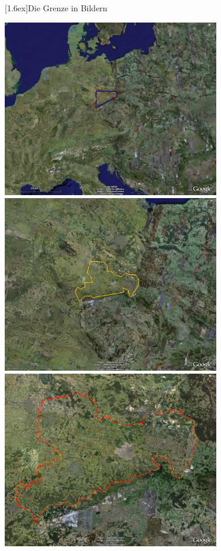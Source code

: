 \documentclass[final]{beamer}
\newlength{\columnheight}
\newlength{\marginw}
\newlength{\tw}
\newlength{\colw}
\newenvironment{myTwoColPoster}{%
  \begin{minipage}[t]{\textwidth}%
    \hspace*{\marginw}%
    \hspace*{9.5bp}%
    \begin{minipage}[t]{\tw}}%
  {\end{minipage}%
   \hspace*{\marginw}%
   \end{minipage}}
\newenvironment{myCol}%
    {\begin{minipage}[t][\columnheight][t]{\colw}}%
    {\end{minipage}}
\newenvironment{textblock}[1]%
    {\begin{block}{\rule[-0.6ex]{0pt}{2.4ex}\raisebox{-0.25ex}[1.6ex]{#1}}%
     \vspace*{5mm}}%
    {\vspace*{5mm}\end{block}}
\begin{document}
\begin{frame}[t]{}
\begin{myTwoColPoster}
\begin{myCol}
\begin{textblock}{Die Grenze in Bildern}
    \begin{minipage}[c]{0.75\textwidth}
      \begin{center}
        \includegraphics[width=0.71\textwidth]{maps/fern3}\\\vspace*{0.2cm}
        \includegraphics[width=0.71\textwidth]{maps/nahe}\\\vspace*{0.2cm}
        \includegraphics[width=0.71\textwidth]{maps/sa6}\\\vspace*{0.2cm}

\end{center}
\end{minipage}
\end{textblock}
\end{myCol}
\end{myTwoColPoster}
\end{frame}
\end{document}
